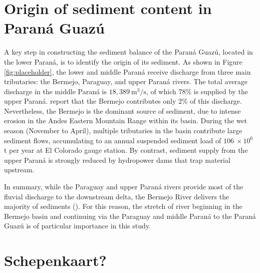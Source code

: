 \section{Origin of sediment content in Paraná Guazú}

A key step in constructing the sediment balance of the Paraná Guazú, located in the lower Paraná, is to identify the origin of its sediment. As shown in Figure \ref{fig:placeholder}, the lower and middle Paraná receive discharge from three main tributaries: the Bermejo, Paraguay, and upper Paraná rivers. The total average discharge in the middle Paraná is $18,389~\mathrm{m^3/s}$, of which 78\% is supplied by the upper Paraná. \citeauthor{lopez_weibel_sources_2022} report that the Bermejo contributes only 2\% of this discharge. Nevertheless, the Bermejo is the dominant source of sediment, due to intense erosion in the Andes Eastern Mountain Range within its basin. During the wet season (November to April), multiple tributaries in the basin contribute large sediment flows, accumulating to an annual suspended sediment load of $106 ~\times 10^6$ t per year at El Colorado gauge station. By contrast, sediment supply from the upper Paraná is strongly reduced by hydropower dams that trap material upstream.  

In summary, while the Paraguay and upper Paraná rivers provide most of the fluvial discharge to the downstream delta, the Bermejo River delivers the majority of sediments (\cite{lopez_weibel_sources_2022}). For this reason, the stretch of river beginning in the Bermejo basin and continuing via the Paraguay and middle Paraná to the Paraná Guazú is of particular importance in this study.  







\section{Schepenkaart?}